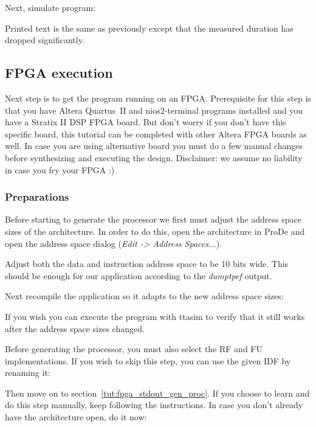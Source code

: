\documentclass[a4paper,twoside]{tceusermanual}
\begin{document}
Next, simulate program:


Printed text is the same as previously except that the measured duration
has dropped significantly.

\subsection{FPGA execution}

Next step is to get the program running on an FPGA. Prerequisite for
this step is that you have Altera Quartus~II and nios2-terminal
programs installed and you have a Stratix II DSP FPGA board. But don't
worry if you don't have this specific board, this tutorial can be
completed with other Altera FPGA boards as well. In case you are using
alternative board you must do a few manual changes before synthesizing and
executing the design. Disclaimer: we assume no liability in case you
fry your FPGA :)

\subsubsection{Preparations}

Before starting to generate the processor we first must adjust the
address space sizes of the architecture. In order to do this, open the
architecture in ProDe and open the address space dialog (\textit{Edit
  -> Address Spaces...}).


Adjust both the data and instruction address space to be 10 bits
wide. This should be enough for our application according to the
\textit{dumptpef} output.

Next recompile the application so it adapts to the new address space
sizes:


If you wish you can execute the program with ttasim to verify that it
still works after the address space sizes changed.

Before generating the processor, you must also select the RF and FU
implementations. If you wish to skip this step, you can use the given
IDF by renaming it: 


Then move on to section~\ref{tut:fpga_stdout_gen_proc}. If you choose
to learn and do this step manually, keep following the
instructions. In case you don't already have the architecture open, do
it now:
\end{document}
